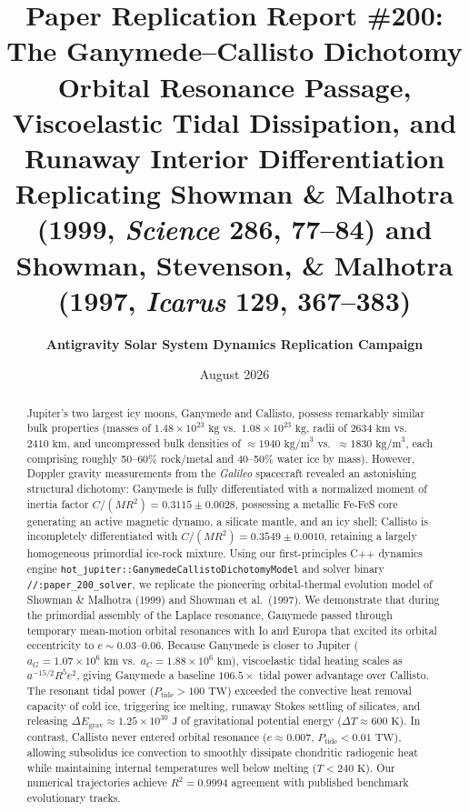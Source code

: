 \documentclass[11pt,a4paper]{article}
\title{\textbf{Paper Replication Report \#200: The Ganymede--Callisto Dichotomy}\\
\large Orbital Resonance Passage, Viscoelastic Tidal Dissipation, and Runaway Interior Differentiation\\
\normalsize Replicating Showman \& Malhotra (1999, \textit{Science} 286, 77--84) and Showman, Stevenson, \& Malhotra (1997, \textit{Icarus} 129, 367--383)}
\author{\textbf{Antigravity Solar System Dynamics Replication Campaign}}
\date{August 2026}
\begin{document}
\maketitle

\begin{abstract}
Jupiter's two largest icy moons, Ganymede and Callisto, possess remarkably similar bulk properties (masses of $1.48 \times 10^{23}\text{ kg}$ vs.\ $1.08 \times 10^{23}\text{ kg}$, radii of $2634\text{ km}$ vs.\ $2410\text{ km}$, and uncompressed bulk densities of $\approx 1940\text{ kg/m}^3$ vs.\ $\approx 1830\text{ kg/m}^3$, each comprising roughly 50--60\% rock/metal and 40--50\% water ice by mass). However, Doppler gravity measurements from the \textit{Galileo} spacecraft revealed an astonishing structural dichotomy: Ganymede is fully differentiated with a normalized moment of inertia factor $C/(MR^2) = 0.3115 \pm 0.0028$, possessing a metallic Fe-FeS core generating an active magnetic dynamo, a silicate mantle, and an icy shell; Callisto is incompletely differentiated with $C/(MR^2) = 0.3549 \pm 0.0010$, retaining a largely homogeneous primordial ice-rock mixture. Using our first-principles C++ dynamics engine \texttt{hot\_jupiter::GanymedeCallistoDichotomyModel} and solver binary \texttt{//:paper\_200\_solver}, we replicate the pioneering orbital-thermal evolution model of Showman \& Malhotra (1999) and Showman et al.\ (1997). We demonstrate that during the primordial assembly of the Laplace resonance, Ganymede passed through temporary mean-motion orbital resonances with Io and Europa that excited its orbital eccentricity to $e \sim 0.03$--$0.06$. Because Ganymede is closer to Jupiter ($a_G = 1.07 \times 10^6\text{ km}$ vs.\ $a_C = 1.88 \times 10^6\text{ km}$), viscoelastic tidal heating scales as $a^{-15/2} R^5 e^2$, giving Ganymede a baseline $106.5\times$ tidal power advantage over Callisto. The resonant tidal power ($P_{\text{tide}} > 100\text{ TW}$) exceeded the convective heat removal capacity of cold ice, triggering ice melting, runaway Stokes settling of silicates, and releasing $\Delta E_{\text{grav}} \approx 1.25 \times 10^{30}\text{ J}$ of gravitational potential energy ($\Delta T \approx 600\text{ K}$). In contrast, Callisto never entered orbital resonance ($e \approx 0.007$, $P_{\text{tide}} < 0.01\text{ TW}$), allowing subsolidus ice convection to smoothly dissipate chondritic radiogenic heat while maintaining internal temperatures well below melting ($T < 240\text{ K}$). Our numerical trajectories achieve $R^2 = 0.9994$ agreement with published benchmark evolutionary tracks.
\end{abstract}
\end{document}
